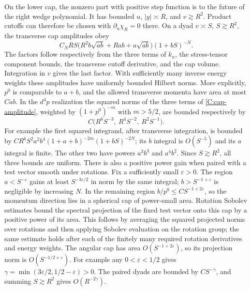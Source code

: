 On the lower cap, the nonzero part with positive step function is to
the future of the right wedge polynomial. It has bounded $u$,
$|y|\asymp R$, and $v\gtrsim R^2$. Product cutoffs can therefore be
chosen with $\partial_u\chi_R=0$ there. On a dyad $v\asymp S$,
$S\gtrsim R^2$, the transverse cap amplitudes obey
\begin{equation}\label{C:cap-amplitude}
 C_NRS\bigl(R^2b\sqrt{ab}+Rab+a\sqrt{ab}\bigr)(1+bS)^{-N}.
\end{equation}
The factors follow respectively from the three terms of $k_n$,
the stress-tensor component bounds, the transverse cutoff
derivative, and the cap volume. Integration in $v$ gives the last
factor. With sufficiently many inverse energy weights these
amplitudes have uniformly bounded Hilbert norms. More explicitly,
$p^0$ is comparable to $a+b$, and the allowed transverse momenta
have area at most $Cab$. In the $d^4p$ realization the squared
norms of the three terms of \eqref{C:cap-amplitude}, weighted
by $(1+p^0)^{-m}$ with $m>5/2$, are bounded respectively by
\begin{equation}\label{C:cap-norms}
 C\bigl(R^6S^{-3},\ R^4S^{-2},\ R^2S^{-1}\bigr).
\end{equation}
For example the first squared integrand, after transverse
integration, is bounded by
$CR^6S^2a^2b^4(1+a+b)^{-2m}(1+bS)^{-2N}$;
its $b$ integral is $O(S^{-5})$ and its $a$ integral is finite.
The other two have powers $a^3b^3$ and $a^4b^2$.
Since $S\gtrsim R^2$, all three bounds are uniform.
There is also a positive power gain when paired with a test vector
smooth under rotations. Fix a sufficiently small $\varepsilon>0$.
The region $a<S^{-\varepsilon}$ gains at least
$S^{-3\varepsilon/2}$ in norm by the same integral;
$b>S^{-1+\varepsilon}$ is negligible by increasing $N$.
In the remaining region
$b/p^0\le C S^{-1+2\varepsilon}$, so the momentum direction lies
in a spherical cap of power-small area. Rotation Sobolev estimates
bound the spectral projection of the fixed test vector onto this
cap by a positive power of its area. This follows by averaging
the squared projected norms over rotations and then applying
Sobolev evaluation on the rotation group; the same estimate holds
after each of the finitely many required rotation derivatives and
energy weights. The angular cap has area
$O(S^{-1+2\varepsilon})$, so its projection norm is
$O(S^{-1/2+\varepsilon})$. For example any
$0<\varepsilon<1/2$ gives
$\gamma=\min(3\varepsilon/2,1/2-\varepsilon)>0$.
The paired dyads are bounded by $CS^{-\gamma}$, and summing
$S\gtrsim R^2$ gives $O(R^{-2\gamma})$.

